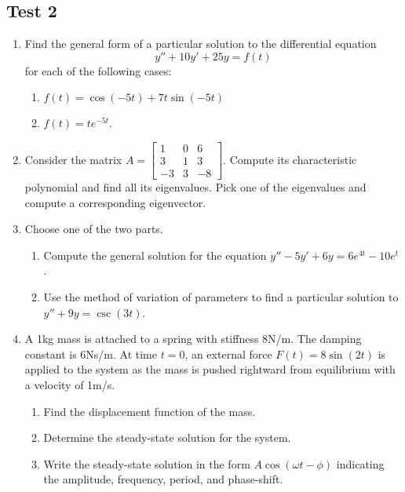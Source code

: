 \subsection{Test 2}

\begin{enumerate}[label=\arabic*.]
	\item 
		Find the general form of a particular solution to the differential equation
		\begin{equation*}
			y'' + 10y' + 25y = f(t)
		\end{equation*}
		for each of the following cases:
		\begin{enumerate}[label=(\alph*)]
			\item 
				$f(t) = \cos{(-5t)} + 7t\sin{(-5t)}$
			\item
				$f(t) = te^{-5t}$.
		\end{enumerate}
	\item
		Consider the matrix $A = \begin{bmatrix}
			1  & 0 & 6 \\
			3  & 1 & 3 \\
			-3 & 3 & -8
		\end{bmatrix}$.
	Compute its characteristic polynomial and find all its eigenvalues.
	Pick one of the eigenvalues and compute a corresponding eigenvector.
	\item
		Choose one of the two parts.
		\begin{enumerate}[label=(\alph*)]
			\item 
				Compute the general solution for the equation $y'' - 5y' + 6y = 6e^{4t} - 10e^{t}$.
			\item Use the method of variation of parameters to find a particular solution to $y'' + 9y = \csc{(3t)}$.
		\end{enumerate}
	\item
		A 1kg mass is attached to a spring with stiffness 8N/m. The damping constant is 6Ns/m.
		At time $t=0$, an external force $F(t) = 8\sin{(2t)}$ is applied to the system as the mass is pushed rightward from equilibrium with a velocity of 1m/s.
		\begin{enumerate}[label=(\alph*)]
			\item
				Find the displacement function of the mass.
			\item
				Determine the steady-state solution for the system.
			\item
				Write the steady-state solution in the form $A\cos{(\omega t - \phi)}$ indicating the amplitude, frequency, period, and phase-shift.

\end{enumerate}
\end{enumerate}
